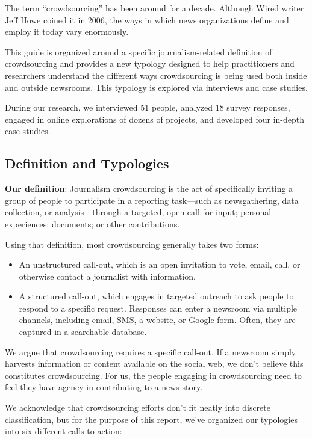 \documentclass[notoc, symmetric, nobib, nols]{towcenter-guideto-book}
\begin{document}
The term “crowdsourcing” has been around for a decade. Although Wired writer Jeff Howe coined it in 2006, the ways in which news organizations define and employ it today vary enormously.

This guide is organized around a specific journalism-related definition of crowdsourcing and provides a new typology designed to help practitioners and researchers understand the different ways crowdsourcing is being used both inside and outside newsrooms. This typology is explored via interviews and case studies. 

During our research, we interviewed 51 people, analyzed 18 survey responses, engaged in online explorations of dozens of projects, and developed four in-depth case studies.

\subsection{Definition and Typologies}

\textbf{Our definition}: Journalism crowdsourcing is the act of specifically inviting a group of people to participate in a reporting task---such as newsgathering, data collection, or analysis---through a targeted, open call for input; personal experiences; documents; or other contributions.

Using that definition, most crowdsourcing generally takes two forms:
 
\begin{itemize}
\item An unstructured call-out, which is an open invitation to vote, email, call, or otherwise contact a journalist with information.\item A structured call-out, which engages in targeted outreach to ask people to respond to a specific request. Responses can enter a newsroom via multiple channels, including email, SMS, a website, or Google form. Often, they are captured in a searchable database.
\end{itemize}

We argue that crowdsourcing requires a specific call-out. If a newsroom simply harvests information or content available on the social web, we don't believe this constitutes crowdsourcing. For us, the people engaging in crowdsourcing need to feel they have agency in contributing to a news story.

We acknowledge that crowdsourcing efforts don't fit neatly into discrete classification, but for the purpose of this report, we've organized our typologies into six different calls to action: 
\end{document}
